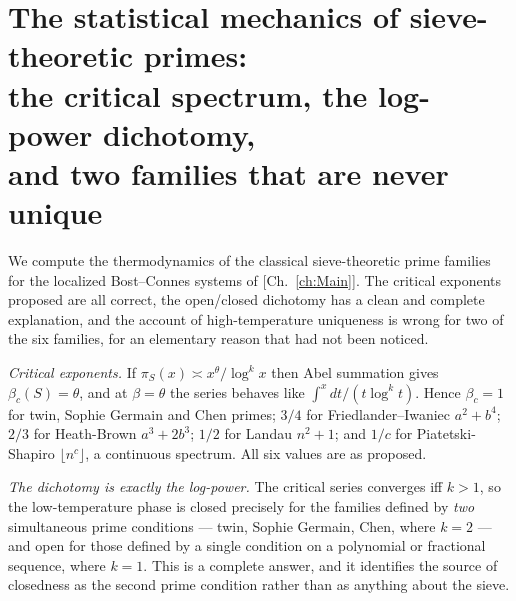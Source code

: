 \chapter[Sieve primes and their phases]{The statistical mechanics of sieve-theoretic primes:\\ the critical spectrum, the log-power dichotomy,\\ and two families that are never unique}\label{ch:XXIV}
\begin{summary}
We compute the thermodynamics of the classical sieve-theoretic prime families for the
localized Bost--Connes systems of [Ch.~\ref{ch:Main}]. The critical exponents proposed are all
correct, the open/closed dichotomy has a clean and complete explanation, and the account of
high-temperature uniqueness is wrong for two of the six families, for an elementary reason
that had not been noticed.

\emph{Critical exponents.} If $\pi_S(x)\asymp x^\theta/\log^kx$ then Abel summation gives
$\beta_c(S)=\theta$, and at $\beta=\theta$ the series behaves like $\int^x dt/(t\log^kt)$.
Hence $\beta_c=1$ for twin, Sophie Germain and Chen primes; $3/4$ for
Friedlander--Iwaniec $a^2+b^4$; $2/3$ for Heath-Brown $a^3+2b^3$; $1/2$ for Landau $n^2+1$;
and $1/c$ for Piatetski-Shapiro $\lfloor n^c\rfloor$, a continuous spectrum. All six values
are as proposed.

\emph{The dichotomy is exactly the log-power.} The critical series converges iff $k>1$, so the
low-temperature phase is closed precisely for the families defined by \emph{two}
simultaneous prime conditions --- twin, Sophie Germain, Chen, where $k=2$ --- and open for
those defined by a single condition on a polynomial or fractional sequence, where $k=1$. This
is a complete answer, and it identifies the source of closedness as the second prime
condition rather than as anything about the sieve.


\end{summary}
